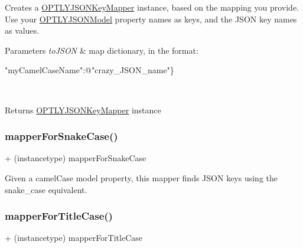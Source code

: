 Creates a \mbox{\hyperlink{interface_o_p_t_l_y_j_s_o_n_key_mapper}{O\+P\+T\+L\+Y\+J\+S\+O\+N\+Key\+Mapper}} instance, based on the mapping you provide. Use your \mbox{\hyperlink{interface_o_p_t_l_y_j_s_o_n_model}{O\+P\+T\+L\+Y\+J\+S\+O\+N\+Model}} property names as keys, and the J\+S\+ON key names as values. 
\begin{DoxyParams}{Parameters}
{\em to\+J\+S\+ON} & map dictionary, in the format\+: 
\begin{DoxyPre}"myCamelCaseName":@"crazy\_JSON\_name"\}\end{DoxyPre}
 \\
\hline
\end{DoxyParams}
\begin{DoxyReturn}{Returns}
\mbox{\hyperlink{interface_o_p_t_l_y_j_s_o_n_key_mapper}{O\+P\+T\+L\+Y\+J\+S\+O\+N\+Key\+Mapper}} instance 
\end{DoxyReturn}
\mbox{\label{interface_o_p_t_l_y_j_s_o_n_key_mapper_a5c00fb2ca67d42c231e36cd565a93a28}} 
\subsubsection{\texorpdfstring{mapper\+For\+Snake\+Case()}{mapperForSnakeCase()}}
{\footnotesize\ttfamily + (instancetype) mapper\+For\+Snake\+Case \begin{DoxyParamCaption}{ }\end{DoxyParamCaption}}

Given a camel\+Case model property, this mapper finds J\+S\+ON keys using the snake\+\_\+case equivalent. \mbox{\label{interface_o_p_t_l_y_j_s_o_n_key_mapper_a74f46610c5b02bada0184694af579db4}} 
\subsubsection{\texorpdfstring{mapper\+For\+Title\+Case()}{mapperForTitleCase()}}
{\footnotesize\ttfamily + (instancetype) mapper\+For\+Title\+Case \begin{DoxyParamCaption}{ }\end{DoxyParamCaption}}

